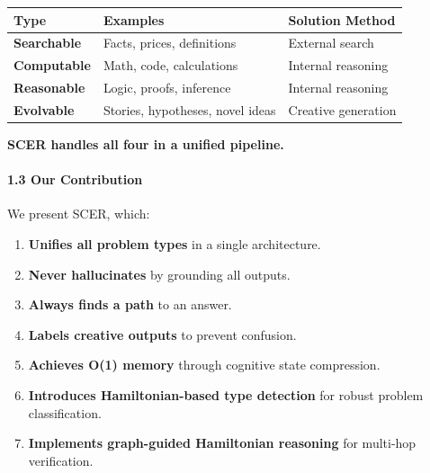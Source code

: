 \documentclass[
  11pt,
  a4paper,
]{article}
\providecommand{\tightlist}{%
  \setlength{\itemsep}{0pt}\setlength{\parskip}{0pt}}
\begin{document}
\begin{longtable}[]{@{}
  >{\raggedright\arraybackslash}p{}
  >{\raggedright\arraybackslash}p{}
  >{\raggedright\arraybackslash}p{}@{}}
\toprule\noalign{}
\begin{minipage}[b]{\linewidth}\raggedright
Type
\end{minipage} & \begin{minipage}[b]{\linewidth}\raggedright
Examples
\end{minipage} & \begin{minipage}[b]{\linewidth}\raggedright
Solution Method
\end{minipage} \\
\midrule\noalign{}
\endhead
\bottomrule\noalign{}
\endlastfoot
\textbf{Searchable} & Facts, prices, definitions & External search \\
\textbf{Computable} & Math, code, calculations & Internal reasoning \\
\textbf{Reasonable} & Logic, proofs, inference & Internal reasoning \\
\textbf{Evolvable} & Stories, hypotheses, novel ideas & Creative
generation \\
\end{longtable}

\textbf{SCER handles all four in a unified pipeline.}

\paragraph{1.3 Our Contribution}\label{our-contribution}

We present SCER, which:

\begin{enumerate}
\def\labelenumi{\arabic{enumi}.}
\tightlist
\item
  \textbf{Unifies all problem types} in a single architecture.
\item
  \textbf{Never hallucinates} by grounding all outputs.
\item
  \textbf{Always finds a path} to an answer.
\item
  \textbf{Labels creative outputs} to prevent confusion.
\item
  \textbf{Achieves O(1) memory} through cognitive state compression.
\item
  \textbf{Introduces Hamiltonian-based type detection} for robust
  problem classification.
\item
  \textbf{Implements graph-guided Hamiltonian reasoning} for multi-hop
  verification.
\end{enumerate}
\end{document}
